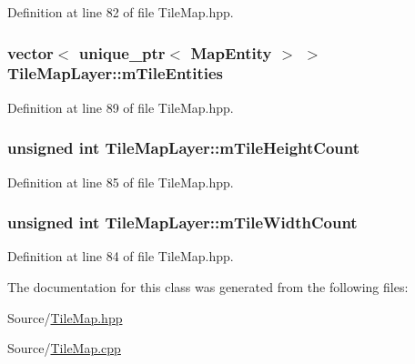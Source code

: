 Definition at line 82 of file Tile\-Map.\-hpp.

\hypertarget{class_tile_map_layer_a9c9c569f4c2f5de09b5541d079f5f97a}{
\subsubsection[{m\-Tile\-Entities}]{\setlength{\rightskip}{0pt plus 5cm}vector$<$ unique\-\_\-ptr$<$ {\bf Map\-Entity} $>$ $>$ Tile\-Map\-Layer\-::m\-Tile\-Entities\hspace{0.3cm}{\ttfamily [protected]}}}\label{class_tile_map_layer_a9c9c569f4c2f5de09b5541d079f5f97a}


Definition at line 89 of file Tile\-Map.\-hpp.

\hypertarget{class_tile_map_layer_ad3731c3f3e38579327eb1a6b40e74af3}{
\subsubsection[{m\-Tile\-Height\-Count}]{\setlength{\rightskip}{0pt plus 5cm}unsigned int Tile\-Map\-Layer\-::m\-Tile\-Height\-Count\hspace{0.3cm}{\ttfamily [protected]}}}\label{class_tile_map_layer_ad3731c3f3e38579327eb1a6b40e74af3}


Definition at line 85 of file Tile\-Map.\-hpp.

\hypertarget{class_tile_map_layer_a1f7ed47471eae14e321db6e2da4d0547}{
\subsubsection[{m\-Tile\-Width\-Count}]{\setlength{\rightskip}{0pt plus 5cm}unsigned int Tile\-Map\-Layer\-::m\-Tile\-Width\-Count\hspace{0.3cm}{\ttfamily [protected]}}}\label{class_tile_map_layer_a1f7ed47471eae14e321db6e2da4d0547}


Definition at line 84 of file Tile\-Map.\-hpp.



The documentation for this class was generated from the following files\-:\begin{DoxyCompactItemize}
\item 
Source/\hyperlink{_tile_map_8hpp}{Tile\-Map.\-hpp}\item 
Source/\hyperlink{_tile_map_8cpp}{Tile\-Map.\-cpp}\end{DoxyCompactItemize}
